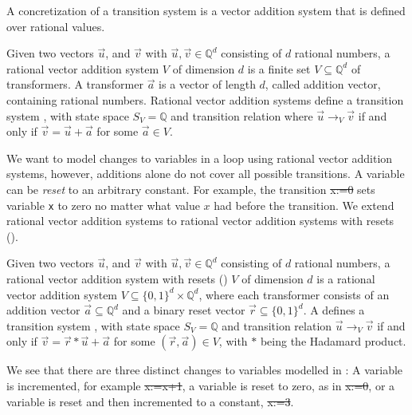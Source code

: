 A concretization of a transition system is a vector addition system that is defined over rational values.

\begin{mydef}
	Given two vectors $\vec{u}$, and $\vec{v}$ with $\vec{u}, \vec{v} \in \mathbb{Q}^d$ consisting of $d$ rational numbers, a rational vector addition system $V$ of dimension $d$ is a finite set $V \subseteq \mathbb{Q}^d$ of transformers. A transformer $\vec{a}$ is a vector of length $d$, called addition vector, containing rational numbers. Rational vector addition systems define a transition system , with state space $S_V = \mathbb{Q}$ and transition relation where $\vec{u} \rightarrow_V \vec{v}$ if and only if $\vec{v} = \vec{u} + \vec{a}$ for some $\vec{a} \in V$. 
\end{mydef}
We want to model changes to variables in a loop using rational vector addition systems, however, additions alone do not cover all possible transitions. A variable can be \textsl{reset} to an arbitrary constant. For example, the transition \st{x:=0} sets variable \texttt{x} to zero no matter what value $x$ had before the transition. We extend rational vector addition systems to rational vector addition systems with resets (\qvasr).

\begin{mydef}
		Given two vectors $\vec{u}$, and $\vec{v}$ with $\vec{u}, \vec{v} \in \mathbb{Q}^d$ consisting of $d$ rational numbers, a rational vector addition system with resets (\qvasr) $V$ of dimension $d$ is a rational vector addition system $V \subseteq \{0, 1\}^d \times \mathbb{Q}^d$, where each transformer consists of an addition vector $\vec{a} \subseteq \mathbb{Q}^d$ and a binary reset vector $\vec{r} \subseteq \{0, 1\}^d$. A \qvasr defines a transition system , with state space $S_V = \mathbb{Q}$ and transition relation $\vec{u} \rightarrow_V \vec{v}$ if and only if $\vec{v} = \vec{r} * \vec{u} + \vec{a}$ for some $(\vec{r}, \vec{a}) \in V$, with $*$ being the Hadamard product.
\end{mydef}
We see that there are three distinct changes to variables modelled in \qvasr: A variable is incremented, for example \st{x:=x+1}, a variable is reset to zero, as in \st{x:=0}, or a variable is reset and then incremented to a constant, \st{x:=3}. \par

